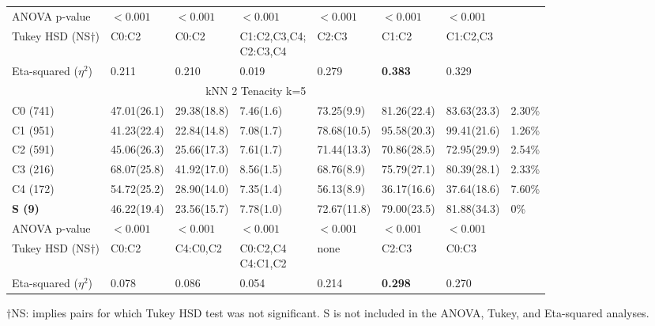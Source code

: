 \documentclass{bmcart}
\begin{document}
\begin{table}[tbp]
{\begin{tabular}{l|lllllll}
ANOVA p-value & $<0.001$ & $<0.001$ & $<0.001$ & $<0.001$ & $<0.001$ & $<0.001$\\								
Tukey HSD (NS$\dagger$) &C0:C2  & C0:C2 & \makecell[l]{C1:C2,C3,C4;\\C2:C3,C4} & C2:C3 &C1:C2 & C1:C2,C3\\								
Eta-squared ($\eta^2$) &0.211	&0.210	&0.019	&0.279	&\textbf{0.383}	&0.329	\\		
\hline
\multicolumn{7}{c}{\rule{0pt}{3ex}kNN 2 Tenacity k=5}       \\                                                                             
C0 (741)	&47.01(26.1)	&29.38(18.8)	&7.46(1.6)	&73.25(9.9)	&81.26(22.4)	&83.63(23.3)	&	2.30\%\\
C1 (951)	&41.23(22.4)	&22.84(14.8)	&7.08(1.7)	&78.68(10.5)	&95.58(20.3)	&99.41(21.6)	&	1.26\%\\
C2 (591)	&45.06(26.3)	&25.66(17.3)	&7.61(1.7)	&71.44(13.3)	&70.86(28.5)	&72.95(29.9)	&	2.54\%\\
C3 (216)	&68.07(25.8)	&41.92(17.0)	&8.56(1.5)	&68.76(8.9)	&75.79(27.1)	&80.39(28.1)	&	2.33\%\\
C4 (172)	&54.72(25.2)	&28.90(14.0)	&7.35(1.4)	&56.13(8.9)	&36.17(16.6)	&37.64(18.6)	&	7.60\%\\
\textbf{S (9)}      &46.22(19.4)    &23.56(15.7)    &7.78(1.0)  &72.67(11.8) &79.00(23.5)   &81.88(34.3)   &   0\%\\
ANOVA p-value & $<0.001$ & $<0.001$ & $<0.001$ & $<0.001$ & $<0.001$ & $<0.001$\\					
Tukey HSD (NS$\dagger$)& C0:C2 & C4:C0,C2 & \makecell{C0:C2,C4\\ C4:C1,C2}& none& C2:C3 &C0:C3
\\					
Eta-squared ($\eta^2$) &0.078	&0.086	&0.054	&0.214	&\textbf{0.298}	&0.270\\
\hline 
\end{tabular}
} %
\begin{tablenotes}\footnotesize
\item $\dagger$NS: implies pairs for which Tukey HSD test was not significant. S is not included in the ANOVA, Tukey, and Eta-squared analyses.

\end{tablenotes}
\end{table}
\end{document}
